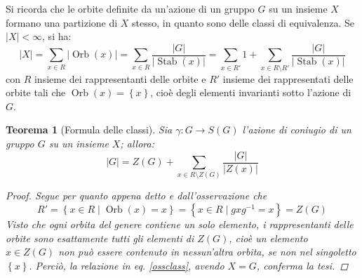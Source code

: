 \documentclass[12pt]{scrartcl}
\theoremstyle{style}
\newtheorem{teorema}{Teorema}[section]
\numberwithin{equation}{subsection}
\begin{document}
Si ricorda che le orbite definite da un'azione di un gruppo $G$ su un insieme $X$ formano una partizione di $X$ stesso, in quanto sono delle classi di equivalenza.
Se $\lvert X \rvert < \infty$, si ha:
\begin{equation}\label{ossclass}
\lvert X \rvert  = \sum_{x \in R}^{} \lvert \operatorname{Orb} (x) \rvert = \sum_{x \in R}^{} \frac{\lvert G \rvert }{\lvert \operatorname{Stab} (x) \rvert } = \sum_{x \in R'}^{} 1 + \sum_{x \in R \setminus R '}^{} \frac{\lvert G \rvert }{\lvert \operatorname{Stab} (x) \rvert }
\end{equation}
con $R$ insieme dei rappresentanti delle orbite e $R'$ insieme dei rappresentati delle orbite tali che $\operatorname{Orb} (x) = \left\{ x \right\} $, cio\`e degli elementi invarianti sotto l'azione di $G$. 
\begin{teorema}
	[Formula delle classi]
	Sia $\gamma:G \to S(G)$ l'azione di coniugio di un gruppo $G$ su un insieme $X$; allora:
	\begin{equation*}
		\lvert G \rvert  = Z(G) + \sum_{x \in R \setminus Z(G)}^{} \frac{\lvert G \rvert }{\lvert Z(x) \rvert }
	\end{equation*}
	\begin{proof}
		Segue per quanto appena detto e dall'osservazione che
		\[
		R' = \left\{ x \in R  \mid \operatorname{Orb} (x) = x \right\} = \left\{ x \in R  \mid gxg^{-1} = x \right\} = Z(G)
		\] 
		Visto che ogni orbita del genere contiene un solo elemento, i rappresentanti delle orbite sono esattamente tutti gli elementi di $Z(G)$, cio\`e un elemento $x \in Z(G)$ non pu\`o essere contenuto in nessun'altra orbita, se non nel singoletto $\left\{ x \right\} $.
		Perci\`o, la relazione in eq. \ref{ossclass}, avendo $X=G$, conferma la tesi.
	\end{proof}
\end{teorema}
\end{document}

